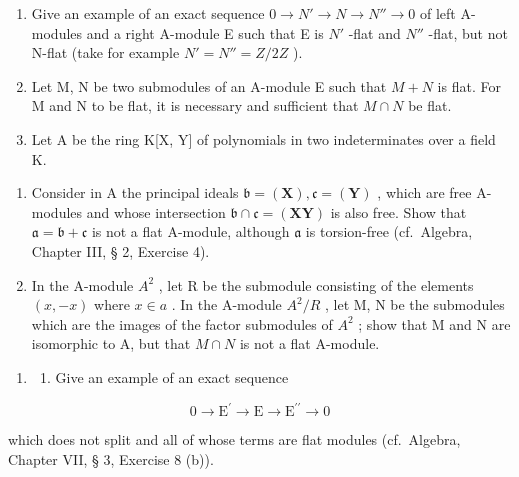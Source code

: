
\begin{enumerate}
\def\labelenumi{\arabic{enumi}.}
\item
  Give an example of an exact sequence \(0 \rightarrow N' \rightarrow N \rightarrow N'' \rightarrow 0\) of left A-modules and a right A-module E such that E is \(N'\) -flat and \(N''\) -flat, but not N-flat (take for example \(N' = N'' = Z/2Z\) ).
\item
  Let M, N be two submodules of an A-module E such that \(M + N\) is flat. For M and N to be flat, it is necessary and sufficient that \(M \cap N\) be flat.
\item
  Let A be the ring K{[}X, Y{]} of polynomials in two indeterminates over a field K.
\end{enumerate}

\begin{enumerate}
\def\labelenumi{(\alph{enumi})}
\item
  Consider in A the principal ideals \(\mathfrak{b} = (\mathbf{X}), \mathfrak{c} = (\mathbf{Y})\) , which are free A-modules and whose intersection \(\mathfrak{b} \cap \mathfrak{c} = (\mathbf{XY})\) is also free. Show that \(\mathfrak{a} = \mathfrak{b} + \mathfrak{c}\) is not a flat A-module, although \(\mathfrak{a}\) is torsion-free (cf.~Algebra, Chapter III, § 2, Exercise 4).
\item
  In the A-module \(A^{2}\) , let R be the submodule consisting of the elements \((x, -x)\) where \(x \in a\) . In the A-module \(A^{2}/R\) , let M, N be the submodules which are the images of the factor submodules of \(A^{2}\) ; show that M and N are isomorphic to A, but that \(M \cap N\) is not a flat A-module.
\end{enumerate}

\begin{enumerate}
\def\labelenumi{\arabic{enumi}.}
\setcounter{enumi}{3}
\tightlist
\item
  \begin{enumerate}
  \def\labelenumii{(\alph{enumii})}
  \tightlist
  \item
    Give an example of an exact sequence
  \end{enumerate}
\end{enumerate}

\[
0 \rightarrow \mathrm{E} ^ {\prime} \rightarrow \mathrm{E} \rightarrow \mathrm{E} ^ {\prime \prime} \rightarrow 0
\]

which does not split and all of whose terms are flat modules (cf.~Algebra, Chapter VII, § 3, Exercise 8 (b)).

